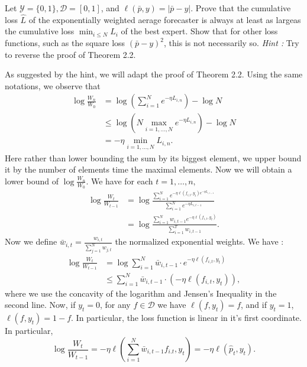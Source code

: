 \begin{exercise}[]{}
	Let $ \mathcal{Y} = \{ 0,1 \}, \mathcal{D} = [0,1] $, and $ \ell(\bar{p},y) = |\bar{p}-y| $. Prove that the cumulative loss $ \hat{L} $ of the exponentially weighted aerage forecaster is always at least as largeas the cumulative loss $ \min_{i \leq N}L_i $ of the best expert. Show that for other loss functions, such as the square loss $ (\bar{p}-y)^2 $, this is not necessarily so. \textit{Hint :} Try to reverse the proof of Theorem 2.2. 
\end{exercise}

\begin{solution}[]
	As suggested by the hint, we will adapt the proof of Theorem 2.2. Using the same notations, we observe that 
\begin{align*}
	\log \frac{W_n}{W_0} &= \log\left(\sum_{i=1}^{N}e^{-\eta L_{i,n}}\right) - \log N \\
	&\leq \log \left( N \max_{i=1,\ldots,N}e^{-\eta L_{i,n}} \right) - \log N\\
	&= - \eta \min_{i=1,\ldots,N} L_{i,n}.
\end{align*}
Here rather than lower bounding the sum by its biggest element, we upper bound it by the number of elements time the maximal elements. Now we will obtain a lower bound of $ \log \frac{W_n}{W_0} $. We have for each $ t=1,\ldots,n, $
\begin{align*}
	\log \frac{W_t}{W_{t-1}} &= \log \frac{\sum_{i=1}^{N}e^{- \eta \ell(f_{i,t},y_t)e^{-\eta L_{i,t-1}}}}{\sum_{i=1}^{N}e^{-\eta L_{i,t-1}}}\\
				 &= \log \frac{\sum_{i=1}^{N}w_{i,t-1}e^{-\eta\ell(f_{i,t},y_t)}}{\sum_{i=1}^{T}w_{i,t-1}}.
\end{align*}
Now we define $ \bar{w}_{i,t} = \frac{w_{i,t}}{\sum_{j=1}^{N}w_{j,t}} $ the normalized exponential weights. We have :
\begin{align*}
	\log \frac{W_t}{W_{t-1}} &= \log \sum_{i=1}^{N} \bar{w}_{i ,t-1}\cdot e^{-\eta\ell(f_{i ,t},y_t)}\\
				 &\leq \sum_{i=1}^{N}\bar{w}_{i ,t-1}\cdot (-\eta\ell(f_{i ,t},y_t)),
\end{align*}
where we use the concavity of the logarithm and Jensen's Inequality in the second line. Now, if $ y_t = 0 $, for any $ f\in \mathcal{D} $ we have $ \ell(f, y_t) = f $, and if $ y_t =1 $, $ \ell(f,y_t) = 1-f $. In particular, the loss function is linear in it's first coordinate. In particular,
\begin{equation*}
	\log \frac{W_t}{W_{t-1}} = -\eta \ell(\sum_{i=1}^{N}\bar{w}_{i,t-1}f_{i.t},y_t) = -\eta \ell(\hat{p}_t,y_t).

\end{equation*}
\end{solution}

